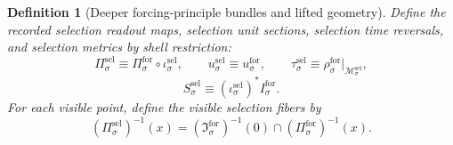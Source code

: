 \documentclass[11pt]{article}
\newcommand{\SelSpace}[1]{\mathcal M_{#1}^{\mathrm{sel}}}
\newcommand{\SelRead}[1]{\Pi_{#1}^{\mathrm{sel}}}
\newcommand{\SelUnit}[1]{u_{#1}^{\mathrm{sel}}}
\newcommand{\SelTimeRev}[1]{\tau_{#1}^{\mathrm{sel}}}
\newcommand{\SelMetric}[1]{S_{#1}^{\mathrm{sel}}}
\newcommand{\SelInc}[1]{\iota_{#1}^{\mathrm{sel}}}
\newcommand{\ForRead}[1]{\Pi_{#1}^{\mathrm{for}}}
\newcommand{\ForUnit}[1]{u_{#1}^{\mathrm{for}}}
\newcommand{\ForTimeRev}[1]{\rho_{#1}^{\mathrm{for}}}
\newcommand{\ForMetric}[1]{I_{#1}^{\mathrm{for}}}
\newcommand{\ForSection}[1]{\mathfrak I_{#1}^{\mathrm{for}}}
\newtheorem{definition}{Definition}
\begin{document}
\begin{definition}[Deeper forcing-principle bundles and lifted geometry]
Define the recorded selection readout maps, selection unit sections, selection time reversals, and selection metrics by shell restriction:
\begin{equation}
\SelRead{\sigma}\equiv \ForRead{\sigma}\circ\SelInc{\sigma},
\qquad
\SelUnit{\sigma}\equiv \ForUnit{\sigma},
\qquad
\SelTimeRev{\sigma}\equiv \ForTimeRev{\sigma}|_{\SelSpace{\sigma}},
\label{eq:selection_basic_structure_from_forcing}
\end{equation}
\begin{equation}
\SelMetric{\sigma}\equiv (\SelInc{\sigma})^*\ForMetric{\sigma}.
\label{eq:selection_metric_from_forcing}
\end{equation}
For each visible point, define the visible selection fibers by
\begin{equation}
(\SelRead{\sigma})^{-1}(x)
=
\left(\ForSection{\sigma}\right)^{-1}(0)\cap(\ForRead{\sigma})^{-1}(x).
\label{eq:selection_fiber_from_forcing}
\end{equation}
\end{definition}
\end{document}
